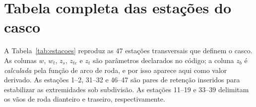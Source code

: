 \chapter{Tabela completa das esta\c{c}\~oes do casco}\label{ap:estacoes}

A Tabela~\ref{tab:estacoes} reproduz as 47 esta{\c{c}}\~oes transversais que definem o casco.
As colunas $w$, $w_t$, $z_s$, $z_{te}$ e $z_t$ s\~ao par\^ametros declarados no c\'odigo; a
coluna $z_b$ \'e \emph{calculada} pela fun{\c{c}}\~ao de arco de roda, e por isso aparece aqui
como valor derivado. As esta{\c{c}}\~oes 1--2, 31--32 e 46--47 s\~ao pares de reten{\c{c}}\~ao
inseridos para estabilizar as extremidades sob subdivis\~ao. As esta{\c{c}}\~oes 11--19 e
33--39 delimitam os v\~aos de roda dianteiro e traseiro, respectivamente.

